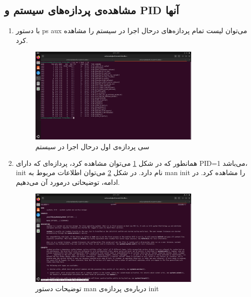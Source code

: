 \documentclass[12pt]{article}
\begin{document}
        \subsection{مشاهده‌ی پردازه‌های سیستم و \textenglish{PID} آنها}

        \begin{enumerate}
        \item 
        با دستور
        \textenglish{ps aux}
        می‌توان لیست تمام پردازه‌های درحال اجرا در سیستم را مشاهده کرد.

        \begin{figure}[H]
		\centering
		\includegraphics[width=0.8\textwidth]{report4-resources/1.png}
		\caption{سی پردازه‌ی اول درحال اجرا در سیستم}
            \label{im1}
	\end{figure}

        \item 

        همانطور که در شکل 
        \ref{im1}
        می‌توان مشاهده کرد، پردازه‌ای که دارای
        \textenglish{PID=1}
        ‌می‌باشد، 
        \textenglish{init}
        نام دارد. در شکل 
        \ref{im2}
        می‌توان اطلاعات مربوط به
        \textenglish{man init}
        را مشاهده کرد. در ادامه، توضیحاتی درمورد آن می‌دهیم.

        \begin{figure}[H]
		\centering
		\includegraphics[width=0.8\textwidth]{report4-resources/2.png}
		\caption{توضیحات دستور \textenglish{man} درباره‌ی پردازه‌ی \textenglish{init}}
            \label{im2}
	\end{figure}


\end{enumerate}
\end{document}
